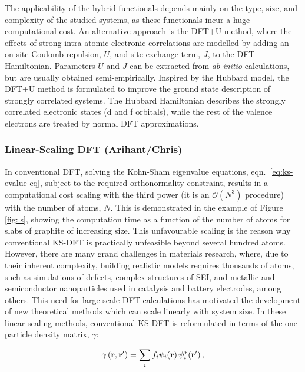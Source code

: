 \documentclass[../main.tex]{subfiles}
\begin{document}
The applicability of the hybrid functionals depends mainly on the type, size, and complexity of the studied systems, as these functionals incur a huge computational cost. An alternative approach is the DFT+U method, where the effects of strong intra-atomic electronic correlations are modelled by adding an on-site Coulomb repulsion, $U$, and site exchange term, $J$, to the DFT Hamiltonian. \cite{DFT-U-1,DFT-U-2,DFT-U-3} Parameters $U$ and $J$ can be extracted from \textit{ab initio} calculations, but are usually obtained semi-empirically. Inspired by the Hubbard model, the DFT+U method is formulated to improve the ground state description of strongly correlated systems. The Hubbard Hamiltonian describes the strongly correlated electronic states (d and f orbitals), while the rest of the valence electrons are treated by normal DFT approximations. 

\subsubsection{Linear-Scaling DFT (Arihant/Chris)}
\label{sec:lsdft}
In conventional DFT, solving the Kohn-Sham eigenvalue equations, eqn.~\ref{eq:ks-evalue-eq}, subject to the required orthonormality constraint, results in a computational cost scaling with the third power (it is an $\mathcal{O}(N^3)$ procedure) with the number of atoms, $N$. This is demonstrated in the example of Figure \ref{fig:ls}, showing the computation time as a function of the number of atoms for slabs of graphite of increasing size. This unfavourable scaling is the reason why conventional KS-DFT is practically unfeasible beyond several hundred atoms. However, there are many grand challenges in materials research, where, due to their inherent complexity, building realistic models requires thousands of atoms, such as simulations of defects, complex structures of SEI, and metallic and semiconductor nanoparticles used in catalysis and battery electrodes, among others. This need for large-scale DFT calculations has motivated the development of new theoretical methods which can scale linearly with system size.\cite{Goedecker1999} In these linear-scaling methods, conventional KS-DFT is reformulated in terms of the one-particle density matrix, $\gamma$:

\begin{equation}
    \gamma\left(\mathbf{r},\mathbf{r'}\right)=\sum\limits_i f_i \psi_i\!\left(\mathbf{r}\right)\psi_i^*\!\left(\mathbf{r'}\right), \label{eq:density-matrix-mos}
\end{equation}
\end{document}
